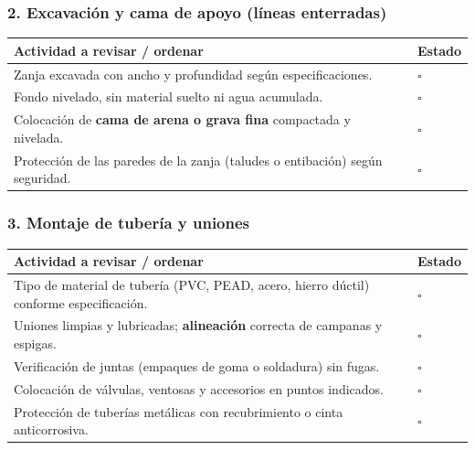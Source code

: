 \documentclass[12pt]{article}
\newcommand{\cbox}{\(\square\)} %
\begin{document}
	\subsubsection*{2. Excavación y cama de apoyo (líneas enterradas)}
	\begin{tabularx}{\linewidth}{>{\raggedright\arraybackslash}p{0.93\linewidth} >{\centering\arraybackslash}m{0.07\linewidth}}
		\toprule
		\textbf{Actividad a revisar / ordenar} & \textbf{Estado}\\
		\midrule
		Zanja excavada con ancho y profundidad según especificaciones. & \cbox \\
		Fondo nivelado, sin material suelto ni agua acumulada. & \cbox \\
		Colocación de \textbf{cama de arena o grava fina} compactada y nivelada. & \cbox \\
		Protección de las paredes de la zanja (taludes o entibación) según seguridad. & \cbox \\
		\bottomrule
	\end{tabularx}
	
	\subsubsection*{3. Montaje de tubería y uniones}
	\begin{tabularx}{\linewidth}{>{\raggedright\arraybackslash}p{0.93\linewidth} >{\centering\arraybackslash}m{0.07\linewidth}}
		\toprule
		\textbf{Actividad a revisar / ordenar} & \textbf{Estado}\\
		\midrule
		Tipo de material de tubería (PVC, PEAD, acero, hierro dúctil) conforme especificación. & \cbox \\
		Uniones limpias y lubricadas; \textbf{alineación} correcta de campanas y espigas. & \cbox \\
		Verificación de juntas (empaques de goma o soldadura) sin fugas. & \cbox \\
		Colocación de válvulas, ventosas y accesorios en puntos indicados. & \cbox \\
		Protección de tuberías metálicas con recubrimiento o cinta anticorrosiva. & \cbox \\
		\bottomrule
	\end{tabularx}
	
\end{document}
